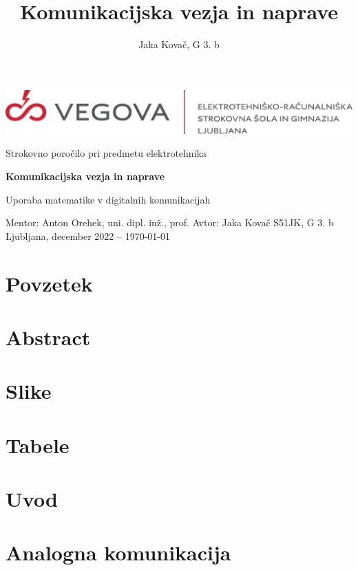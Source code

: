 \documentclass[12pt]{article}
\title{Komunikacijska vezja in naprave}
\author{Jaka Kovač, G 3. b}
\begin{document}

\begin{center}
    \thispagestyle{empty}
    \includegraphics[scale=1]{slike/logotip_vegova_leze_brezokvirja.png}
    
    \vspace{\fill} 
    Strokovno poročilo pri predmetu elektrotehnika

    \Huge{\textbf{Komunikacijska vezja in naprave}}

    \normalsize
    Uporaba matematike v digitalnih komunikacijah
    \vspace{\fill}

    Mentor: Anton Orehek, uni. dipl. inž., prof. \hfill Avtor: Jaka Kovač S51JK,
    G 3. b\\
    \null
    Ljubljana, december 2022 – \MMYYYYdate\today
\end{center}
\newpage
\thispagestyle{empty}
\null
\newpage
\thispagestyle{empty}

\section*{Povzetek}
\section*{Abstract}

\newpage
\thispagestyle{empty}
\tableofcontents

\begingroup
\makeatletter
\section*{Slike}
\let\clearpage\relax
\section*{Tabele}
\makeatother
\endgroup


\newpage
\section{Uvod}
\newpage
\section{Analogna komunikacija}
\end{document}
